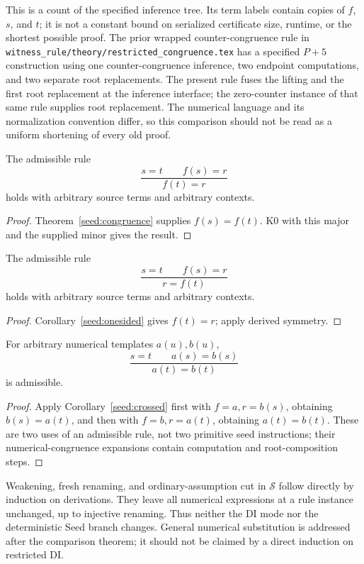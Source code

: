This is a count of the specified inference tree. Its term labels contain
copies of $f$, $s$, and $t$; it is not a constant bound on serialized
certificate size, runtime, or the shortest possible proof. The prior
wrapped counter-congruence rule in
\texttt{witness\_rule/theory/restricted\_congruence.tex} has a specified
$P+5$ construction using one counter-congruence inference, two endpoint
computations, and two separate root replacements. The present rule fuses
the lifting and the first root replacement at the inference interface;
the zero-counter instance of that same rule supplies root replacement.
The numerical language and its normalization convention differ, so this
comparison should not be read as a uniform shortening of every old proof.

\begin{corollary}\label{seed:onesided}
The admissible rule
\[
 \frac{s=t\qquad f(s)=r}{f(t)=r}
\]
holds with arbitrary source terms and arbitrary contexts.
\end{corollary}
\begin{proof}
Theorem~\ref{seed:congruence} supplies $f(s)=f(t)$. K0 with this
major and the supplied minor gives the result.
\end{proof}

\begin{corollary}\label{seed:crossed}
The admissible rule
\[
 \frac{s=t\qquad f(s)=r}{r=f(t)}
\]
holds with arbitrary source terms and arbitrary contexts.
\end{corollary}
\begin{proof}
Corollary~\ref{seed:onesided} gives $f(t)=r$; apply derived symmetry.
\end{proof}

\begin{corollary}\label{seed:eqtransport}
For arbitrary numerical templates $a(u),b(u)$,
\[
 \frac{s=t\qquad a(s)=b(s)}{a(t)=b(t)}
\]
is admissible.
\end{corollary}
\begin{proof}
Apply Corollary~\ref{seed:crossed} first with $f=a,r=b(s)$,
obtaining $b(s)=a(t)$, and then with $f=b,r=a(t)$, obtaining
$a(t)=b(t)$. These are two uses of an admissible rule, not two
primitive seed instructions; their numerical-congruence expansions
contain computation and root-composition steps.
\end{proof}

Weakening, fresh renaming, and ordinary-assumption cut in $\mathcal S$
follow directly by induction on derivations. They leave all numerical
expressions at a rule instance unchanged, up to injective renaming.
Thus neither the DI mode nor the deterministic Seed branch changes.
General numerical substitution is addressed after the comparison theorem;
it should not be claimed by a direct induction on restricted DI.


